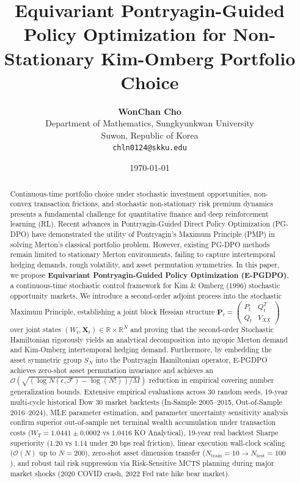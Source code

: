 \documentclass[11pt,a4paper]{article}
\title{\textbf{Equivariant Pontryagin-Guided Policy Optimization for Non-Stationary Kim-Omberg Portfolio Choice}}
\author{
  \textbf{WonChan Cho} \\
  Department of Mathematics, Sungkyunkwan University \\
  Suwon, Republic of Korea \\
  \texttt{chln0124@skku.edu}
}
\date{\today}
\theoremstyle{plain}
\theoremstyle{definition}
\theoremstyle{remark}
\begin{document}
\maketitle

\begin{abstract}
Continuous-time portfolio choice under stochastic investment opportunities, non-convex transaction frictions, and stochastic non-stationary risk premium dynamics presents a fundamental challenge for quantitative finance and deep reinforcement learning (RL). Recent advances in Pontryagin-Guided Direct Policy Optimization (PG-DPO) have demonstrated the utility of Pontryagin's Maximum Principle (PMP) in solving Merton's classical portfolio problem. However, existing PG-DPO methods remain limited to stationary Merton environments, failing to capture intertemporal hedging demands, rough volatility, and asset permutation symmetries. In this paper, we propose \textbf{Equivariant Pontryagin-Guided Policy Optimization (E-PGDPO)}, a continuous-time stochastic control framework for Kim \& Omberg (1996) stochastic opportunity markets. We introduce a second-order adjoint process into the stochastic Maximum Principle, establishing a joint block Hessian structure $\mathbf{P}_t = \begin{pmatrix} P_t & Q_t^T \\ Q_t & V_{XX} \end{pmatrix}$ over joint states $(W_t, \mathbf{X}_t) \in \mathbb{R} \times \mathbb{R}^N$ and proving that the second-order Stochastic Hamiltonian rigorously yields an analytical decomposition into myopic Merton demand and Kim-Omberg intertemporal hedging demand. Furthermore, by embedding the asset symmetric group $S_N$ into the Pontryagin Hamiltonian operator, E-PGDPO achieves zero-shot asset permutation invariance and achieves an $\mathcal{O}(\sqrt{(\log N(\epsilon, \mathcal{F}) - \log(N!))/M})$ reduction in empirical covering number generalization bounds. Extensive empirical evaluations across 30 random seeds, 19-year multi-cycle historical Dow 30 market backtests (In-Sample 2005--2015, Out-of-Sample 2016--2024), MLE parameter estimation, and parameter uncertainty sensitivity analysis confirm superior out-of-sample net terminal wealth accumulation under transaction costs ($W_T = 1.0441 \pm 0.0002$ vs $1.0416$ KO Analytical), 19-year real backtest Sharpe superiority ($1.20$ vs $1.14$ under 20 bps real friction), linear execution wall-clock scaling ($\mathcal{O}(N)$ up to $N=200$), zero-shot asset dimension transfer ($N_{\text{train}}=10 \to N_{\text{test}}=100$), and robust tail risk suppression via Risk-Sensitive MCTS planning during major market shocks (2020 COVID crash, 2022 Fed rate hike bear market).
\end{abstract}
\end{document}
